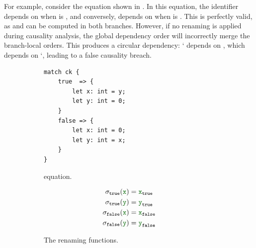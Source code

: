 For example, consider the \GRSync {} equation shown in
.
In this equation, the identifier  depends on  when  is \true, and
conversely,  depends on  when  is \false. This is perfectly valid, as
 and  can be computed in both branches.
%
However, if no renaming is applied during causality analysis, the global dependency order will
incorrectly merge the branch-local orders. This produces a circular dependency:
` depends on , which depends on `, leading to a false causality breach.

\begin{figure}[!ht]
    \centering
    \begin{subfigure}[b]{0.3\textwidth}
        \begin{lstlisting}[language=GRust]
match ck {
    true  => {
        let x: int = y;
        let y: int = 0;
    }
    false => {
        let x: int = 0;
        let y: int = x;
    }
}
\end{lstlisting}
        \caption[\GRSync {} equation.]%
        {\GRSync {} equation.}
        \label{fig:semantics:grsync:causality:dependencies:renaming:example:code}
    \end{subfigure}
    \quad
    \begin{subfigure}[b]{0.3\textwidth}
        \begin{align}
            \sigma_\true(\idf{x})  & = \idf{x}_\true \label{eq:semantics:grsync:causality:dependencies:renaming:example:rename:true:x}   \\
            \sigma_\true(\idf{y})  & = \idf{y}_\true \label{eq:semantics:grsync:causality:dependencies:renaming:example:rename:true:y}   \\
            \sigma_\false(\idf{x}) & = \idf{x}_\false \label{eq:semantics:grsync:causality:dependencies:renaming:example:rename:false:x} \\
            \sigma_\false(\idf{y}) & = \idf{y}_\false \label{eq:semantics:grsync:causality:dependencies:renaming:example:rename:false:y}
        \end{align}
        \caption[Renaming functions for the  equation.]%
        {The renaming functions.}
        \label{fig:semantics:grsync:causality:dependencies:renaming:example:rename}
    \end{subfigure}
    \quad
    \begin{subfigure}[b]{0.3\textwidth}
        \centering

\end{subfigure}
\end{figure}
